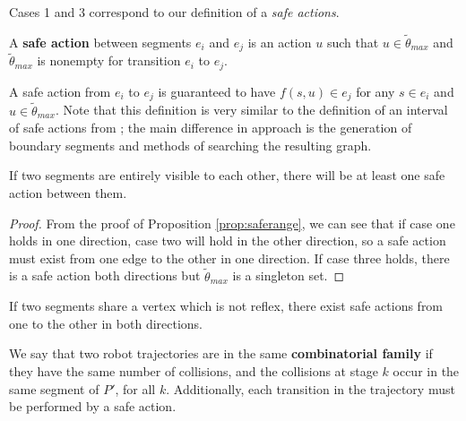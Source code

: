 \documentclass[]{styles/svproc}  %
\begin{document}
Cases 1 and 3 correspond to our definition of a \emph{safe actions}.

\begin{definition} \label{def:sa}
A \textbf{safe action} between segments $e_i$ and $e_j$ is an action $u$ such
that $u \in \tilde{\theta}_{max}$ and $\tilde{\theta}_{max}$ is nonempty for 
transition $e_i$ to $e_j$.
\end{definition}

A safe action from $e_i$ to $e_j$ is guaranteed to
have $f(s,u) \in e_j$ for any $s \in e_i$ and $u \in \tilde{\theta}_{max}$.
Note that this definition is very similar to the definition of an interval of
safe actions from \cite{LewOKa13}; the main difference in approach is the
generation of boundary segments and methods of searching the resulting graph.

\begin{lemma}
If two segments are entirely visible to each other, there will be at least one safe
action between them.
\end{lemma}

\begin{proof}
From the proof of Proposition \ref{prop:saferange}, we can see that if case one
holds in one direction, case two will hold in the other direction, so a safe
action must exist from one edge to the other in one direction. If case three
holds, there is a safe action both directions but $\tilde{\theta}_{max}$ is a
singleton set.
\end{proof}

\begin{corollary}
If two segments share a vertex which is not reflex, there exist safe actions
from one to the other in both directions.
\end{corollary}



\begin{definition}
We say that two robot trajectories are in the same \textbf{combinatorial family}
if they have the same number of collisions, and the collisions at stage $k$
occur in the same segment of $P'$, for all $k$. Additionally, each transition in
the trajectory must be performed by a safe action.
\end{definition}


%
%
\end{document}
